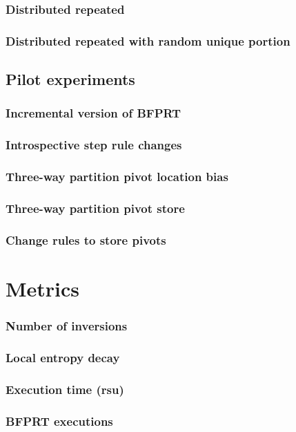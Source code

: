 \documentclass{iccmemoria}
\begin{document}
\subsubsection{Distributed repeated}
\subsubsection{Distributed repeated with random unique portion}
\subsection{Pilot experiments}
\subsubsection{Incremental version of BFPRT}
\subsubsection{Introspective step rule changes}
\subsubsection{Three-way partition pivot location bias}
\subsubsection{Three-way partition pivot store}
\subsubsection{Change rules to store pivots}
\section{Metrics}
\subsubsection{Number of inversions}
\subsubsection{Local entropy decay}
\subsubsection{Execution time (rsu)}
\subsubsection{BFPRT executions}
\end{document}
